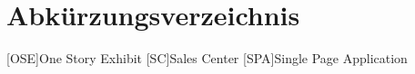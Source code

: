 \chapter{Abkürzungsverzeichnis}

\begin{acronym}[OSE]
  [OSE]{One Story Exhibit}
  [SC]{Sales Center}
  [SPA]{Single Page Application}
\end{acronym}
